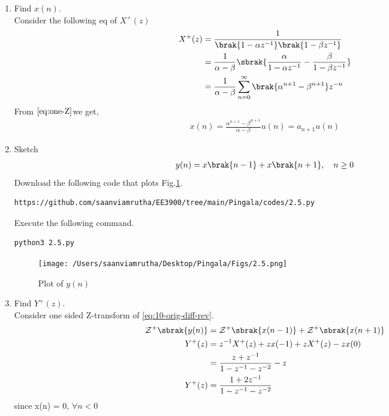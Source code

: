 \documentclass[journal,12pt,twocolumn]{IEEEtran}
\renewcommand\thesection{\arabic{section}}
\begin{document}
\begin{enumerate}[label=\thesection.\arabic*,ref=\thesection.\theenumi]
\item Find $x(n)$.\\
\solution Consider the following eq of $X^{+}(z)$
\begin{align}
X^{+}(z) &= \frac{1}{\brak{1-\alpha z^{-1}}\brak{1-\beta z^{-1}}}\\
&= \frac{1}{\alpha - \beta} \sbrak{\frac{\alpha}{1-\alpha z^{-1}} - \frac{\beta}{1-\beta z^{-1}}}\\ &= \frac{1}{\alpha - \beta} \sum_{n=0}^{\infty} \brak{{\alpha}^{n+1} - {\beta}^{n+1}} z^{-n}
\end{align}
From $\eqref{eq:one-Z}$we get,
\begin{align}
x(n) = \frac{{\alpha}^{n+1} - {\beta}^{n+1}}{\alpha - \beta} u(n) = a_{n+1} u(n)
\label{eq:xn}
\end{align}


\item Sketch 
\begin{align}
	y(n)	 = x\brak{n-1} + x\brak{n+1},  \quad n \ge 0
	\label{eq:10-orig-diff-rev}
\end{align}
\solution Download the following code that plots Fig.\ref{fig:2.5}.
\begin{lstlisting}
https://github.com/saanviamrutha/EE3900/tree/main/Pingala/codes/2.5.py
\end{lstlisting}
Execute the following command.
\begin{lstlisting}
python3 2.5.py
\end{lstlisting}
\begin{figure}[!ht]
\centering
\texttt{[image: /Users/saanviamrutha/Desktop/Pingala/Figs/2.5.png]}
\caption{Plot of $y(n)$}
\label{fig:2.5}
\end{figure}

\item Find $Y^{+}(z)$. \\
\solution Consider one sided Z-transform of \eqref{eq:10-orig-diff-rev}.
\begin{align}
\mathcal{Z}^{+}\sbrak{y(n)} &= \mathcal{Z}^{+}\sbrak{x(n-1)} + \mathcal{Z}^{+}\sbrak{x(n+1)}\\ 
{Y}^{+}(z) &=  z^{-1}X^{+}(z) + zx(-1)+zX^{+}(z) - zx(0) \\
 &= \frac{z+z^{-1}}{1-z^{-1}-z^{-2}} - z\\ 
 Y^{+}(z) &= \frac{1+2z^{-1}}{1-z^{-1}-z^{-2}}
\end{align}
since x(n) = 0, $\forall n<0$


\end{enumerate}
\end{document}
